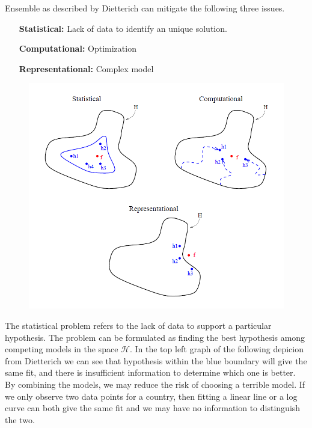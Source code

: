 \documentclass[nojss]{jss}\usepackage[]{graphicx}\usepackage[]{color}
\begin{document}
Ensemble as described by Dietterich can mitigate the following
three issues.

\begin{itemize}
  \setlength{\itemindent}{1in}
  \item[\textbf{Statistical:}] Lack of data to identify an unique solution.
  \item[\textbf{Computational:}] Optimization
  \item[\textbf{Representational:}] Complex model
\end{itemize}



\begin{figure}[!ht]
  \centering
  \includegraphics[scale = 0.7]{dietterich.png}
\end{figure}


The statistical problem refers to the lack of data to support a
particular hypothesis. The problem can be formulated as finding the
best hypothesis among competing models in the space
$\mathbf{\mathcal{H}}$. In the top left graph of the following
depicion from Dietterich we can see that hypothesis within the blue
boundary will give the same fit, and there is insufficient information
to determine which one is better. By combining the models, we may
reduce the risk of choosing a terrible model. If we only observe two
data points for a country, then fitting a linear line or a log curve
can both give the same fit and we may have no information to
distinguish the two.\\
\end{document}

